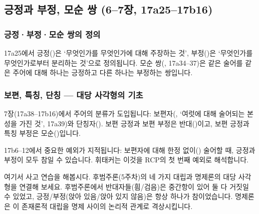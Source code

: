\documentclass[12pt, a4paper]{article}
\begin{document}
\subsection{긍정과 부정, 모순 쌍 (6--7장, 17a25--17b16)}

\subsubsection{긍정·부정·모순 쌍의 정의}

17a25에서 긍정()은 `무엇인가를 무엇인가에 대해 주장하는 것', 부정()은 `무엇인가를 무엇인가로부터 분리하는 것'으로 정의됩니다. 모순 쌍(, 17a34--37)은 같은 술어를 같은 주어에 대해 하나는 긍정하고 다른 하나는 부정하는 쌍입니다.

\subsubsection{보편, 특칭, 단칭 --- 대당 사각형의 기초}

7장(17a38--17b16)에서 주어의 분류가 도입됩니다: 보편자(, `여럿에 대해 술어되는 본성을 가진 것', 17a39)와 단칭자(). 보편 긍정과 보편 부정은 반대()이고, 보편 긍정과 특칭 부정은 모순()입니다.

17b6--12에서 중요한 예외가 지적됩니다: 보편자에 대해 한정 없이() 술어할 때, 긍정과 부정이 모두 참일 수 있습니다. 휘태커는 이것을 RCP의 첫 번째 예외로 해석합니다.

여기서 사고 연습을 해봅시다. 후범주론(5주차)의 네 가지 대립과 명제론의 대당 사각형을 연결해 보세요. 후범주론에서 반대자들(흼/검음)은 중간항이 있어 둘 다 거짓일 수 있었고, 긍정/부정(앉아 있음/앉아 있지 않음)은 항상 하나가 참이었습니다. 명제론은 이 존재론적 대립을 명제 사이의 논리적 관계로 격상시킵니다.
\end{document}
